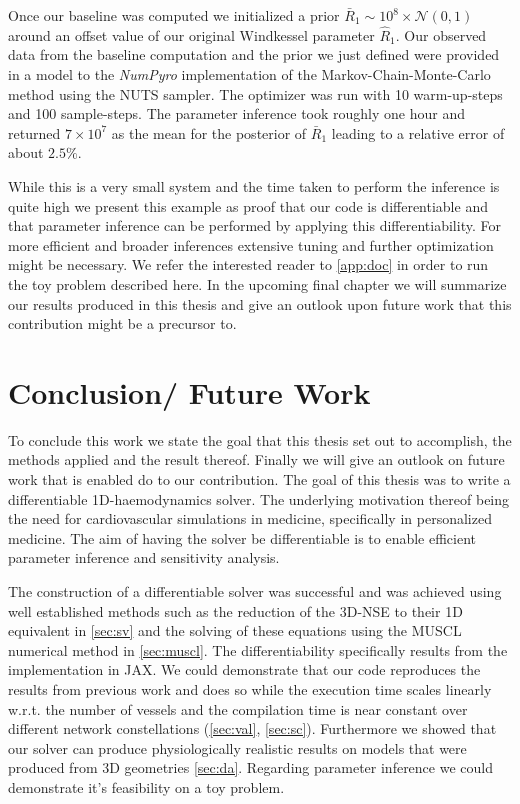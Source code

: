 \documentclass[a4paper, oneside]{discothesis}
\begin{document}
Once our baseline was computed we initialized a prior $\bar{R}_1 \sim 10^8 \times \mathcal{N}(0,1)$ around an offset value of our original Windkessel parameter $\hat{R}_1$.
Our observed data from the baseline computation and the prior we just defined were provided in a model to the \emph{NumPyro} \cite{phan2019composable,bingham2019pyro} implementation of the Markov-Chain-Monte-Carlo method using the NUTS sampler.
The optimizer was run with 10 warm-up-steps and 100 sample-steps.
The parameter inference took roughly one hour and returned $7 \times 10^7$ as the mean for the posterior of $\bar{R}_1$ leading to a relative error of about $2.5\%$.

While this is a very small system and the time taken to perform the inference is quite high we present this example as proof that our code is differentiable and that parameter inference can be performed by applying this differentiability.
For more efficient and broader inferences extensive tuning and further optimization might be necessary. We refer the interested reader to \autoref{app:doc} in order to run the toy problem described here.
In the upcoming final chapter we will summarize our results produced in this thesis and give an outlook upon future work that this contribution might be a precursor to.

\chapter{Conclusion/ Future Work}
To conclude this work we state the goal that this thesis set out to accomplish, the methods applied and the result thereof.
Finally we will give an outlook on future work that is enabled do to our contribution.
The goal of this thesis was to write a differentiable 1D-haemodynamics solver.
The underlying motivation thereof being the need for cardiovascular simulations in medicine, specifically in personalized medicine.
The aim of having the solver be differentiable is to enable efficient parameter inference and sensitivity analysis.

The construction of a differentiable solver was successful and was achieved using well established methods such as the reduction of the 3D-NSE to their 1D equivalent in \autoref{sec:sv} and the solving of these equations using the MUSCL numerical method in \autoref{sec:muscl}.
The differentiability specifically results from the implementation in JAX.
We could demonstrate that our code reproduces the results from previous work and does so while the execution time scales linearly w.r.t. the number of vessels and the compilation time is near constant over different network constellations (\autoref{sec:val}, \autoref{sec:sc}).
Furthermore we showed that our solver can produce physiologically realistic results on models that were produced from 3D geometries \autoref{sec:da}.
Regarding parameter inference we could demonstrate it's feasibility on a toy problem.
\end{document}

